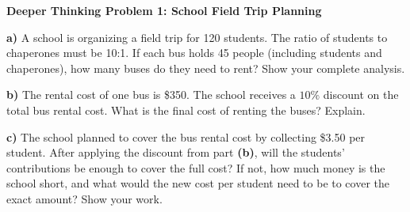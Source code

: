 \documentclass[12pt, letterpaper, fleqn]{article}
\begin{document}
\newpage

\begin{tcolorbox}[colback=white, colframe=black, boxrule=1pt, arc=4mm, left=6mm, right=6mm, top=5mm, bottom=5mm]
\textbf{Deeper Thinking Problem 1: School Field Trip Planning}

\medskip

\noindent
\textbf{a)} A school is organizing a field trip for 120 students. The ratio of students to chaperones must be 10:1. If each bus holds 45 people (including students and chaperones), how many buses do they need to rent? Show your complete analysis.

\vspace{5cm}

\noindent
\textbf{b)} The rental cost of one bus is \$350. The school receives a $10\%$ discount on the total bus rental cost. What is the final cost of renting the buses? Explain.

\vspace{5cm}

\noindent
\textbf{c)} The school planned to cover the bus rental cost by collecting \$3.50 per student. After applying the discount from part \textbf{(b)}, will the students' contributions be enough to cover the full cost? If not, how much money is the school short, and what would the new cost per student need to be to cover the exact amount? Show your work.
\vspace{5cm}

\end{tcolorbox}

\vspace{3mm}
\end{document}
